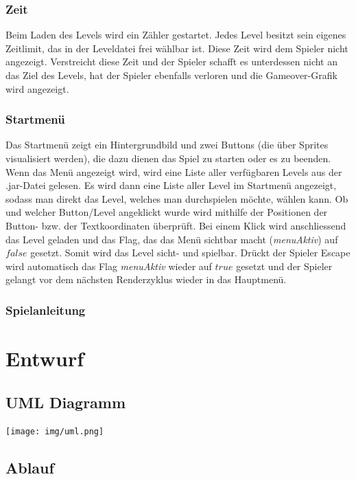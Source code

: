 \documentclass[12pt,a4paper]{scrartcl}
\newcommand{\inmilestonetwo}{\vspace{0.75cm} \framebox[1.1\width]{
\begin{large}
\textcolor{red}{Die Dokumentation dieses Abschnittes ist für Milestone II vorgesehen.}
\end{large}}}
\begin{document}
\subsubsection{Zeit}
Beim Laden des Levels wird ein Zähler gestartet. Jedes Level besitzt sein eigenes Zeitlimit, das in der Leveldatei frei wählbar ist.
Diese Zeit wird dem Spieler nicht angezeigt. Verstreicht diese Zeit und der Spieler schafft es unterdessen nicht an das Ziel des Levels,
hat der Spieler ebenfalls verloren und die Gameover-Grafik wird angezeigt.

\subsubsection{Startmenü}
Das Startmenü zeigt ein Hintergrundbild und zwei Buttons (die über Sprites visualisiert werden), die dazu dienen das Spiel zu starten oder es zu beenden.
Wenn das Menü angezeigt wird, wird eine Liste aller verfügbaren Levels aus der .jar-Datei gelesen. Es wird dann eine
Liste aller Level im Startmenü angezeigt, sodass man direkt das Level, welches man durchspielen möchte, wählen kann.
Ob und welcher Button/Level angeklickt wurde wird mithilfe der Positionen der Button- bzw. der Textkoordinaten überprüft.
Bei einem Klick wird anschliessend das Level geladen und das Flag, das das Menü sichtbar macht (\textit{menuAktiv}) auf $false$
gesetzt. Somit wird das Level sicht- und spielbar. Drückt der Spieler Escape wird automatisch das Flag \textit{menuAktiv} wieder auf $true$
gesetzt und der Spieler gelangt vor dem nächsten Renderzyklus wieder in das Hauptmenü.

\subsubsection{Spielanleitung}
\inmilestonetwo

\clearpage
\newpage
\section{Entwurf}
\subsection{UML Diagramm}
\vspace{0.3cm}
\texttt{[image: img/uml.png]}

\subsection{Ablauf}
\inmilestonetwo
\end{document}
